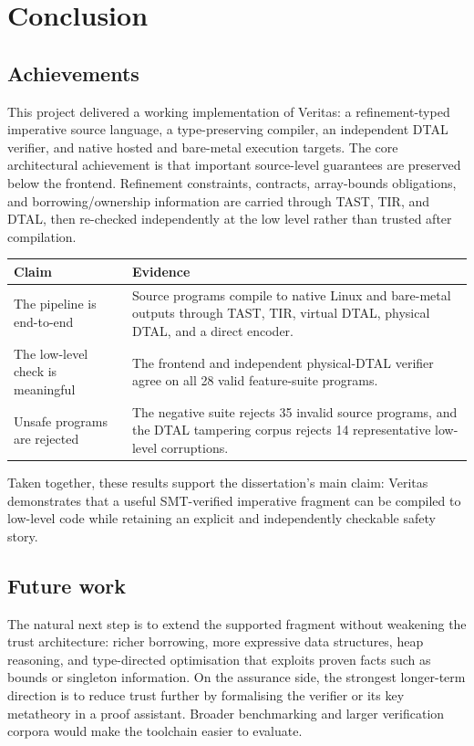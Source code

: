 \chapter{Conclusion}\label{ch:conclusion}

\section{Achievements}
This project delivered a working implementation of Veritas: a refinement-typed imperative source language, a type-preserving compiler, an independent DTAL verifier, and native hosted and bare-metal execution targets. The core architectural achievement is that important source-level guarantees are preserved below the frontend. Refinement constraints, contracts, array-bounds obligations, and borrowing/ownership information are carried through TAST, TIR, and DTAL, then re-checked independently at the low level rather than trusted after compilation.

\begin{center}
\small
\begin{tabularx}{0.96\textwidth}{>{\raggedright\arraybackslash}p{} >{\raggedright\arraybackslash}X}
\toprule
\textbf{Claim} & \textbf{Evidence} \\
\midrule
The pipeline is end-to-end & Source programs compile to native Linux and bare-metal outputs through TAST, TIR, virtual DTAL, physical DTAL, and a direct encoder. \\
The low-level check is meaningful & The frontend and independent physical-DTAL verifier agree on all 28 valid feature-suite programs. \\
Unsafe programs are rejected & The negative suite rejects 35 invalid source programs, and the DTAL tampering corpus rejects 14 representative low-level corruptions. \\
\bottomrule
\end{tabularx}
\end{center}

Taken together, these results support the dissertation's main claim: Veritas demonstrates that a useful SMT-verified imperative fragment can be compiled to low-level code while retaining an explicit and independently checkable safety story.

\section{Future work}
The natural next step is to extend the supported fragment without weakening the trust architecture: richer borrowing, more expressive data structures, heap reasoning, and type-directed optimisation that exploits proven facts such as bounds or singleton information. On the assurance side, the strongest longer-term direction is to reduce trust further by formalising the verifier or its key metatheory in a proof assistant. Broader benchmarking and larger verification corpora would make the toolchain easier to evaluate.


